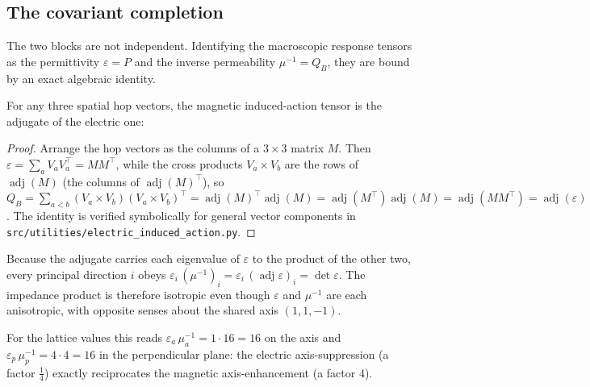 \subsection{The covariant completion}
\label{subsec:covariant_completion}

The two blocks are not independent. Identifying the macroscopic response tensors
as the permittivity $\varepsilon=P$ and the inverse permeability $\mu^{-1}=Q_B$,
they are bound by an exact algebraic identity.

\begin{theorem}
    \label{thm:adjugate}
    For any three spatial hop vectors, the magnetic induced-action tensor is the
    adjugate of the electric one:
    \begin{equation}
        \label{eq:adjugate}
        
    \end{equation}
\end{theorem}

\begin{proof}
    Arrange the hop vectors as the columns of a $3\times3$ matrix $M$. Then
    $\varepsilon=\sum_a V_a V_a^{\!\top}=M M^{\!\top}$, while the cross products
    $V_a\!\times\!V_b$ are the rows of $\operatorname{adj}(M)$ (the columns of
    $\operatorname{adj}(M)^{\!\top}$), so
    $Q_B=\sum_{a<b}(V_a\!\times\!V_b)(V_a\!\times\!V_b)^{\!\top}
    =\operatorname{adj}(M)^{\!\top}\!\operatorname{adj}(M)
    =\operatorname{adj}(M^{\!\top})\operatorname{adj}(M)
    =\operatorname{adj}(MM^{\!\top})=\operatorname{adj}(\varepsilon)$. The
    identity is verified symbolically for general vector components in
    \texttt{src/utilities/electric\_induced\_action.py}.
\end{proof}

\begin{corollary}
    \label{cor:impedance}
    Because the adjugate carries each eigenvalue of $\varepsilon$ to the product
    of the other two, every principal direction $i$ obeys
    $\varepsilon_i\,(\mu^{-1})_i=\varepsilon_i\,(\operatorname{adj}\varepsilon)_i
    =\det\varepsilon$. The impedance product is therefore isotropic even though
    $\varepsilon$ and $\mu^{-1}$ are each anisotropic, with opposite senses about
    the shared axis $(1,1,-1)$.
\end{corollary}

For the lattice values this reads $\varepsilon_a\,\mu^{-1}_a=1\cdot16=16$ on the
axis and $\varepsilon_p\,\mu^{-1}_p=4\cdot4=16$ in the perpendicular plane: the
electric axis-suppression (a factor $\tfrac14$) exactly reciprocates the magnetic
axis-enhancement (a factor $4$).

